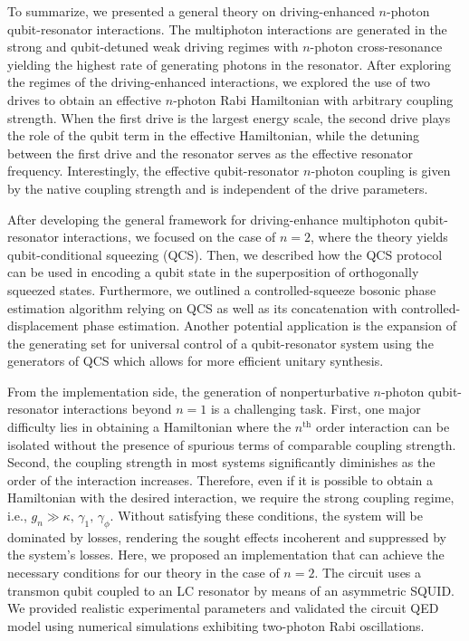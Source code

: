 To summarize, we presented a general theory on driving-enhanced $n$-photon qubit-resonator interactions. The multiphoton interactions are generated in the strong and qubit-detuned weak driving regimes with $n$-photon cross-resonance yielding the highest rate of generating photons in the resonator. After exploring the regimes of the driving-enhanced interactions, we explored the use of two drives to obtain an effective $n$-photon Rabi Hamiltonian with arbitrary coupling strength. When the first drive is the largest energy scale, the second drive plays the role of the qubit term in the effective Hamiltonian, while the detuning between the first drive and the resonator serves as the effective resonator frequency. Interestingly, the effective qubit-resonator $n$-photon coupling is given by the native coupling strength and is independent of the drive parameters.  

After developing the general framework for driving-enhance multiphoton qubit-resonator interactions, we focused on the case of $n=2$, where the theory yields qubit-conditional squeezing (QCS). Then, we described how the QCS protocol can be used in encoding a qubit state in the superposition of orthogonally squeezed states. {Furthermore, we outlined a controlled-squeeze bosonic phase estimation algorithm relying on QCS as well as its concatenation with controlled-displacement phase estimation. {Another potential application is} the expansion of the generating set for universal control of a qubit-resonator system using the generators of QCS which allows for more efficient unitary synthesis.}


From the implementation side, the generation of nonperturbative $n$-photon qubit-resonator interactions beyond $n=1$ is a challenging task. First, one major difficulty lies in obtaining a Hamiltonian where the $n^{\text{th}}$ order interaction can be isolated without the presence of spurious terms of comparable coupling strength. Second, the coupling strength in most systems significantly diminishes as the order of the interaction increases. Therefore, even if it is possible to obtain a Hamiltonian with the desired interaction, we require the strong coupling regime, i.e., $g_n \gg \kappa,\,\gamma_1,\,\gamma_\phi$. Without satisfying these conditions, the system will be dominated by losses, rendering the sought effects incoherent and suppressed by the system's losses. Here, we proposed an implementation that can achieve the necessary conditions for our theory in the case of $n=2$. The circuit uses a transmon qubit coupled to {an LC} resonator by means of an asymmetric SQUID. We provided realistic experimental parameters and validated the circuit QED model using numerical simulations exhibiting two-photon Rabi oscillations.

